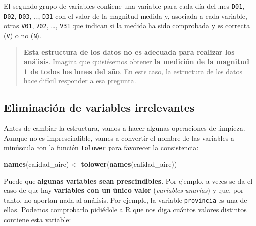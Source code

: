 \documentclass[]{article}
\newenvironment{Shaded}{\begin{snugshade}}{\end{snugshade}}
\newcommand{\KeywordTok}[1]{\textcolor[rgb]{0.13,0.29,0.53}{\textbf{#1}}}
\newcommand{\NormalTok}[1]{#1}
\newcommand{\OperatorTok}[1]{\textcolor[rgb]{0.81,0.36,0.00}{\textbf{#1}}}
\newcommand{\StringTok}[1]{\textcolor[rgb]{0.31,0.60,0.02}{#1}}
\begin{document}
El segundo grupo de variables contiene una variable para cada día del
mes \texttt{D01}, \texttt{D02}, \texttt{D03}, \ldots{}, \texttt{D31} con
el valor de la magnitud medida y, asociada a cada variable, otras
\texttt{V01}, \texttt{V02}, \ldots{}, \texttt{V31} que indican si la
medida ha sido comprobada y es correcta (\texttt{V}) o no (\texttt{N}).

\begin{quote}
\textbf{Esta estructura de los datos no es adecuada para realizar los
análisis}. Imagina que quisiésemos obtener \textbf{la medición de la
magnitud 1 de todos los lunes del año}. En este caso, la estructura de
los datos hace difícil responder a esa pregunta.
\end{quote}

\hypertarget{eliminacion-de-variables-irrelevantes}{%
\subsection{Eliminación de variables
irrelevantes}\label{eliminacion-de-variables-irrelevantes}}

Antes de cambiar la estructura, vamos a hacer algunas operaciones de
limpieza. Aunque no es imprescindible, vamos a convertir el nombre de
las variables a minúscula con la función \texttt{tolower} para favorecer
la consistencia:

\begin{Shaded}
\begin{Highlighting}[]
\KeywordTok{names}\NormalTok{(calidad_aire) <-}\StringTok{ }\KeywordTok{tolower}\NormalTok{(}\KeywordTok{names}\NormalTok{(calidad_aire))}
\end{Highlighting}
\end{Shaded}

Puede que \textbf{algunas variables sean prescindibles}. Por ejemplo, a
veces se da el caso de que hay \textbf{variables con un único valor}
(\emph{variables unarias}) y que, por tanto, no aportan nada al
análisis. Por ejemplo, la variable \texttt{provincia} es una de ellas.
Podemos comprobarlo pidiédole a R que nos diga cuántos valores distintos
contiene esta variable:

\begin{Shaded}
\end{Shaded}
\end{document}
